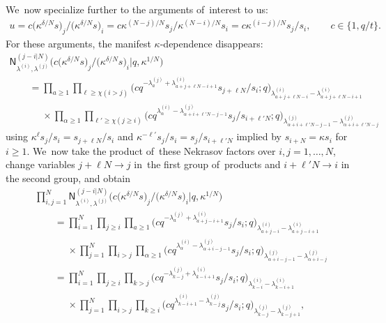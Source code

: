 \documentclass[pdftex]{sigma}%
\numberwithin{equation}{section}
\begin{document}
We~now specialize further to the arguments of~interest to us:
\begin{gather*}
u = c\big(\kappa^{\delta/N} s\big)_j/\big(\kappa^{\delta/N} s\big)_i = c \kappa^{(N-j)/N}s_j/\kappa^{(N-i)/N}s_i = c \kappa^{(i-j)/N} s_j/s_i ,\qquad c\in\{1,q/t\}.
\end{gather*}
For these arguments, the manifest $\kappa$-dependence disappears:
\begin{gather*}
\mathsf{N}^{(j-i|N)}_{\lambda^{(i)},\lambda^{(j)}}\big(c\big(\kappa^{\delta/N} s\big)_j/\big(\kappa^{\delta/N} s\big)_i|q,\kappa^{1/N}\big)
\\ \qquad
= \prod_{a\geq 1}\prod_{\ell\geq \chi(i>j)}\big(c q^{-\lambda^{(j)}_a+\lambda^{(i)}_{a+j+\ell N-i+1}}s_{j+\ell N}/s_i;q\big)_{\lambda^{(i)}_{a+j+\ell N-i}-\lambda^{(i)}_{a+j+\ell N-i+1}}
\\ \qquad\phantom{=}
{}\times \prod_{\alpha\geq 1}\prod_{\ell'\geq \chi(j\geq i)}\big(cq^{\lambda^{(i)}_\alpha-\lambda^{(j)}_{\alpha+i+\ell' N-j-1}}s_j/s_{i+\ell'N};q\big)_{\lambda^{(j)}_{\alpha+i+\ell' N-j-1}-\lambda^{(j)}_{\alpha+i+\ell' N-j}}
\end{gather*}
using $\kappa^\ell s_j/s_i=s_{j+\ell N}/s_i$ and $\kappa^{-\ell'} s_j/s_i=s_j/s_{i+\ell' N}$ implied by $s_{i+N}=\kappa s_i$ for~$i\geq 1$.
We~now take the product of~these Nekrasov factors over $i,j=1,\dots,N$, change variables $j+\ell N\to j$ in~the first group of~products and $i+\ell' N\to i$ in the second group, and obtain
\begin{gather*}
\prod_{i,j=1}^N \mathsf{N}^{(j-i|N)}_{\lambda^{(i)},\lambda^{(j)}}\big(c\big(\kappa^{\delta/N} s\big)_j/\big(\kappa^{\delta/N} s\big)_i|q,\kappa^{1/N}\big)
\\ \qquad
{}= \prod_{i=1}^N \prod_{j\geq i} \prod_{a\geq 1}\big(c q^{-\lambda^{(j)}_a+\lambda^{(i)}_{a+j-i+1}}s_{j}/s_i;q\big)_{\lambda^{(i)}_{a+j-i}-\lambda^{(i)}_{a+j-i+1}} \\ \qquad\phantom{=}
{}\times\prod_{j=1}^N \prod_{i>j} \prod_{\alpha\geq 1}\big(cq^{\lambda^{(i)}_\alpha-\lambda^{(j)}_{\alpha+i-j-1}}s_j/s_{i};q\big)_{\lambda^{(j)}_{\alpha+i-j-1}-\lambda^{(j)}_{\alpha+i-j}} \\ \qquad
{}= \prod_{i=1}^N \prod_{j\geq i} \prod_{k>j}\big(c q^{-\lambda^{(j)}_{k-j}+\lambda^{(i)}_{k-i+1}}s_{j}/s_i;q\big)_{\lambda^{(i)}_{k-i}-\lambda^{(i)}_{k-i+1}}
\\ \qquad\phantom{=}
{}\times\prod_{j=1}^N \prod_{i>j} \prod_{k\geq i}\big(cq^{\lambda^{(i)}_{k-i+1}-\lambda^{(j)}_{k-j}}s_j/s_{i};q\big)_{\lambda^{(j)}_{k-j}
-\lambda^{(j)}_{k-j+1}},
\end{gather*}
\end{document}
